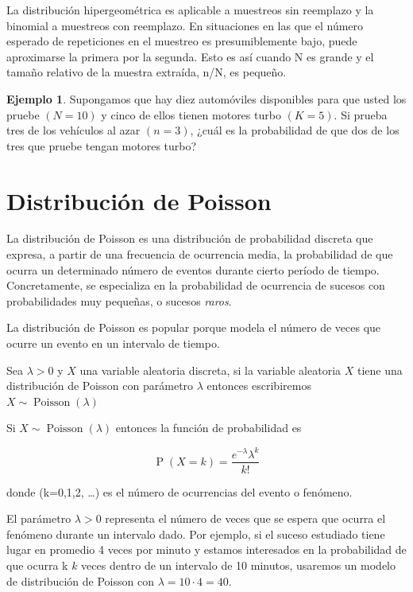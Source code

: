 \documentclass[]{book}
\theoremstyle{plain}
\theoremstyle{definition}
\newtheorem{example}[theorem]{Ejemplo}
\theoremstyle{definition} %
\begin{document}
La distribución hipergeométrica es aplicable a muestreos sin reemplazo y
la binomial a muestreos con reemplazo. En situaciones en las que el
número esperado de repeticiones en el muestreo es presumiblemente bajo,
puede aproximarse la primera por la segunda. Esto es así cuando N es
grande y el tamaño relativo de la muestra extraída, n/N, es pequeño.

\begin{example}
  
Supongamos que hay diez automóviles disponibles para que usted los
pruebe \((N = 10)\) y cinco de ellos tienen motores turbo \((K = 5)\).
Si prueba tres de los vehículos al azar \((n = 3)\), ¿cuál es la
probabilidad de que dos de los tres que pruebe tengan motores turbo?
\end{example}

\hypertarget{distribuciuxf3n-de-poisson}{%
\section{Distribución de Poisson}\label{distribuciuxf3n-de-poisson}}

La distribución de Poisson es una distribución de probabilidad discreta
que expresa, a partir de una frecuencia de ocurrencia media, la
probabilidad de que ocurra un determinado número de eventos durante
cierto período de tiempo. Concretamente, se especializa en la
probabilidad de ocurrencia de sucesos con probabilidades muy pequeñas, o
sucesos \emph{raros}.

La distribución de Poisson es popular porque modela el número de veces
que ocurre un evento en un intervalo de tiempo.

Sea \(\displaystyle \lambda >0\) y \(X\) una variable aleatoria
discreta, si la variable aleatoria \(X\) tiene una distribución de
Poisson con parámetro \(\lambda\) entonces escribiremos
\(\displaystyle X\sim \operatorname {Poisson} (\lambda )\)

Si \(\displaystyle X\sim \operatorname {Poisson} (\lambda )\) entonces
la función de probabilidad es

\[\displaystyle \operatorname {P} (X=k)={\frac {e^{-\lambda }\lambda ^{k}}{k!}}\]

donde (k=0,1,2, \dots ) es el número de ocurrencias del evento o
fenómeno.

El parámetro \(\displaystyle \lambda >0\) representa el número de veces
que se espera que ocurra el fenómeno durante un intervalo dado. Por
ejemplo, si el suceso estudiado tiene lugar en promedio 4 veces por
minuto y estamos interesados en la probabilidad de que ocurra k \(k\)
veces dentro de un intervalo de 10 minutos, usaremos un modelo de
distribución de Poisson con \(\lambda = 10\cdot 4 = 40\).
\end{document}
